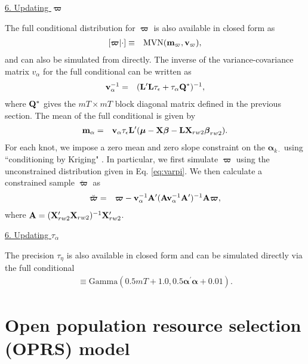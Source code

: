 \documentclass[12pt,fleqn]{article}
\begin{document}
\begin{flushleft}
\underline{6. Updating $\boldsymbol{\varpi}$}

The full conditional distribution for $\boldsymbol{\varpi}$ is also available in closed form as
\begin{eqnarray}
  \label{eq:varpi}
  [\boldsymbol{\varpi} | \cdot] & \equiv & \textrm{MVN}({\bf m}_{\varpi},{\bf v}_{\varpi}),
\end{eqnarray}
and can also be simulated from directly.  The inverse of the variance-covariance matrix $v_{\alpha}$ for the full conditional can be written as
\begin{eqnarray*}
  {\bf v}_{\alpha}^{-1} & = & ({\bf L}^{\prime}{\bf L} \tau_\epsilon + \tau_\alpha {\bf Q}^*)^{-1},
\end{eqnarray*}
where ${\bf Q}^*$ gives the $mT \times mT$ block diagonal matrix defined in the previous section.
The mean of the full conditional is given by
\begin{eqnarray*}
  {\bf m}_{\alpha} & = & {\bf v}_\alpha \tau_\epsilon {\bf L}^\prime (\boldsymbol{\mu}- {\bf X} \boldsymbol{\beta} - {\bf L}{\bf X}_{rw2}\boldsymbol{\beta}_{rw2}).
\end{eqnarray*}
For each knot, we impose a zero mean and zero slope constraint on the $\boldsymbol{\alpha}_{k \cdot}$ using ``conditioning by Kriging" \citep[cf.][, Eq. 2.30]{RueHeld2005}.  In particular, we first simulate $\boldsymbol{\varpi}$ using the unconstrained distribution given in Eq. \ref{eq:varpi}.  We then calculate a constrained sample $\breve{\boldsymbol{\varpi}}$ as
\begin{eqnarray*}
  \breve{\boldsymbol{\varpi}} & = & \boldsymbol{\varpi}-{\bf v}_{\alpha}^{-1}{\bf A}^\prime ({\bf A}{\bf v}_{\alpha}^{-1} {\bf A}^\prime)^{-1}{\bf A} \boldsymbol{\varpi},
\end{eqnarray*}
where ${\bf A} = ({\bf X}_{rw2}^\prime {\bf X}_{rw2})^{-1} {\bf X}_{rw2}^\prime$.

\underline{6. Updating $\tau_\alpha$}

The precision $\tau_\eta$ is also available in closed form and can be simulated directly via the full conditional
\begin{eqnarray*}
  [\tau_\eta | \cdot] \equiv \textrm{Gamma}(0.5mT + 1.0,0.5 \boldsymbol{\alpha}^\prime \boldsymbol{\alpha} + 0.01).
\end{eqnarray*}

\section{Open population resource selection (OPRS) model}


\end{flushleft}
\end{document}
